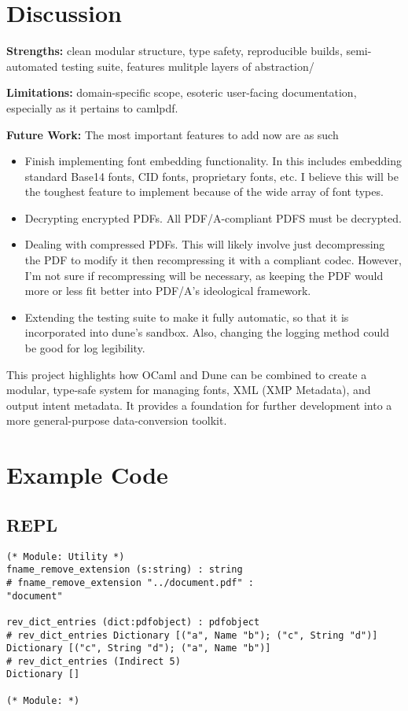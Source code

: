 \documentclass[11pt]{article}
\begin{document}
\section*{Discussion}
\textbf{Strengths:} clean modular structure, type safety, reproducible builds, semi-automated testing suite, features mulitple layers of abstraction/  

\textbf{Limitations:} domain-specific scope, esoteric user-facing documentation, especially as it pertains to camlpdf.  

\textbf{Future Work:} The most important features to add now are as such
\begin{itemize}
  \item Finish implementing font embedding functionality. In this includes embedding standard Base14 fonts, CID fonts, proprietary fonts, etc. I believe this will be the toughest feature to implement because of the wide array of font types. 
  \item Decrypting encrypted PDFs. All PDF/A-compliant PDFS must be decrypted.
  \item Dealing with compressed PDFs. This will likely involve just decompressing the PDF to modify it then recompressing it with a compliant codec. However, I'm not sure if recompressing will be necessary, as keeping the PDF would more or less fit better into PDF/A's ideological framework.
  \item Extending the testing suite to make it fully automatic, so that it is incorporated into dune's sandbox. Also, changing the logging method could be good for log legibility. 
\end{itemize}
  

This project highlights how OCaml and Dune can be combined to create a modular, type-safe system for managing fonts, XML (XMP Metadata), and output intent metadata. It provides a foundation for further development into a more general-purpose data-conversion toolkit.

\section*{Example Code}
\subsection*{REPL}
\begin{verbatim}
(* Module: Utility *)
fname_remove_extension (s:string) : string
# fname_remove_extension "../document.pdf" : 
"document"

rev_dict_entries (dict:pdfobject) : pdfobject
# rev_dict_entries Dictionary [("a", Name "b"); ("c", String "d")]
Dictionary [("c", String "d"); ("a", Name "b")]
# rev_dict_entries (Indirect 5)
Dictionary []

(* Module: *)


\end{verbatim}
\end{document}
